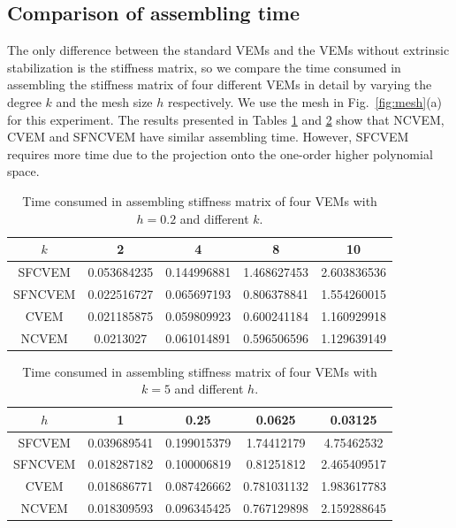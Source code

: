 \documentclass[10pt]{amsart}
\numberwithin{equation}{section}
\begin{document}
\subsection{Comparison of assembling time}
The only difference between the standard VEMs and the VEMs without extrinsic stabilization is the
stiffness matrix, so we compare the time consumed in assembling the stiffness matrix of
four different VEMs in detail by varying the degree $k$ and the mesh size $h$
respectively. We use the mesh in Fig.~\ref{fig:mesh}(a) for this experiment.
The results presented in Tables
\ref{tab:ptime} and \ref{tab:ttime} show that NCVEM, CVEM and SFNCVEM have similar assembling time. 
However, SFCVEM requires more time due to the projection onto the one-order higher polynomial space.
\begin{table}[htbp]
\caption{Time consumed in assembling stiffness matrix of four VEMs with
 $h=0.2$ and different $k$.}
\label{tab:ptime}
\centering
\begin{tabular}{c|cccc}
\hline
$k$ & 2 & 4 & 8 & 10 \\
\hline
SFCVEM & 0.053684235 & 0.144996881 & 1.468627453 & 2.603836536 \\
SFNCVEM & 0.022516727 & 0.065697193 & 0.806378841 & 1.554260015 \\
CVEM & 0.021185875 & 0.059809923 & 0.600241184 & 1.160929918 \\
NCVEM & 0.0213027 & 0.061014891 & 0.596506596 & 1.129639149 \\
\hline
\end{tabular}
\end{table}
\begin{table}[htbp]
\caption{Time consumed in assembling stiffness matrix of four VEMs with $k = 5$ and different $h$.}
\label{tab:ttime}
\centering
\begin{tabular}{c|cccc}
\hline
$h$ &    1	& 0.25 & 0.0625 & 0.03125\\
\hline
SFCVEM & 0.039689541 & 0.199015379	& 1.74412179	& 4.75462532\\
SFNCVEM & 0.018287182 & 0.100006819	& 0.81251812	& 2.465409517\\
CVEM & 0.018686771 & 0.087426662	& 0.781031132	& 1.983617783\\
NCVEM & 0.018309593 & 0.096345425	& 0.767129898	& 2.159288645\\
\hline
\end{tabular}
\end{table}
\end{document}
